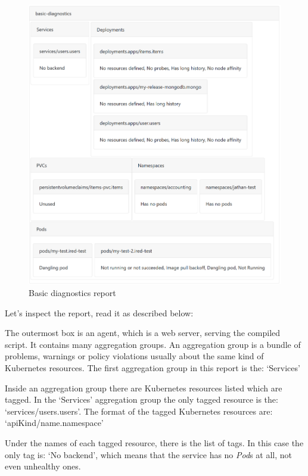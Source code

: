 \begin{figure}[h]
  \centering
  \includegraphics[width=150mm, keepaspectratio]{content/30_caseStudy1/report.png}
  \caption{Basic diagnostics report}
  \label{fig:case_2}
\end{figure}

Let's inspect the report, read it as described below:

The outermost box is an agent, which is a web server, serving the compiled script. It contains many aggregation groups. An aggregation group is a bundle of problems, warnings or policy violations usually about the same kind of Kubernetes resources. The first aggregation group in this report is the: `Services'

Inside an aggregation group there are Kubernetes resources listed which are tagged. In the `Services' aggregation group the only tagged resource is the: `services/users.users'. The format of the tagged Kubernetes resources are: `apiKind/name.namespace'

Under the names of each tagged resource, there is the list of tags. In this case the only tag is: `No backend', which means that the service has no \emph{Pod}s at all, not even unhealthy ones.

